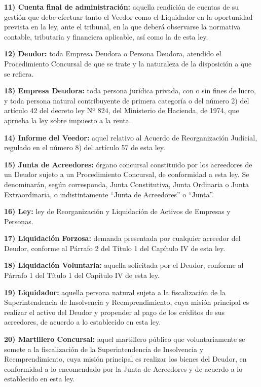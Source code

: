 \documentclass[
]{book}
\begin{document}
\textbf{11) Cuenta final de administración:} aquella rendición de cuentas de su gestión que debe efectuar tanto el Veedor como el Liquidador en la oportunidad prevista en la ley, ante el tribunal, en la que deberá observarse la normativa contable, tributaria y financiera aplicable, así como la de esta ley.

\textbf{12) Deudor:} toda Empresa Deudora o Persona Deudora, atendido el Procedimiento Concursal de que se trate y la naturaleza de la disposición a que se refiera.

\textbf{13) Empresa Deudora:} toda persona jurídica privada, con o sin fines de lucro, y toda persona natural contribuyente de primera categoría o del número 2) del artículo 42 del decreto ley Nº 824, del Ministerio de Hacienda, de 1974, que aprueba la ley sobre impuesto a la renta.

\textbf{14) Informe del Veedor:} aquel relativo al Acuerdo de Reorganización Judicial, regulado en el número 8) del artículo 57 de esta ley.

\textbf{15) Junta de Acreedores:} órgano concursal constituido por los acreedores de un Deudor sujeto a un Procedimiento Concursal, de conformidad a esta ley. Se denominarán, según corresponda, Junta Constitutiva, Junta Ordinaria o Junta Extraordinaria, o indistintamente ``Junta de Acreedores'' o ``Junta''.

\textbf{16) Ley:} ley de Reorganización y Liquidación de Activos de Empresas y Personas.

\textbf{17) Liquidación Forzosa:} demanda presentada por cualquier acreedor del Deudor, conforme al Párrafo 2 del Título 1 del Capítulo IV de esta ley.

\textbf{18) Liquidación Voluntaria:} aquella solicitada por el Deudor, conforme al Párrafo 1 del Título 1 del Capítulo IV de esta ley.

\textbf{19) Liquidador:} aquella persona natural sujeta a la fiscalización de la Superintendencia de Insolvencia y Reemprendimiento, cuya misión principal es realizar el activo del Deudor y propender al pago de los créditos de sus acreedores, de acuerdo a lo establecido en esta ley.

\textbf{20) Martillero Concursal:} aquel martillero público que voluntariamente se somete a la fiscalización de la Superintendencia de Insolvencia y Reemprendimiento, cuya misión principal es realizar los bienes del Deudor, en conformidad a lo encomendado por la Junta de Acreedores y de acuerdo a lo establecido en esta ley.
\end{document}

